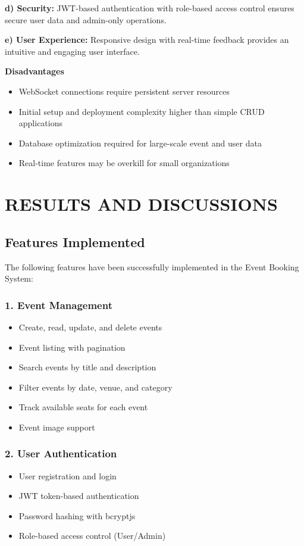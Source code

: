 \documentclass[12pt]{report}
\begin{document}
\textbf{d) Security:} 
JWT-based authentication with role-based access control ensures secure user data and admin-only operations.

\textbf{e) User Experience:} 
Responsive design with real-time feedback provides an intuitive and engaging user interface.

\textbf{Disadvantages} 

\begin{itemize}
\item WebSocket connections require persistent server resources
\item Initial setup and deployment complexity higher than simple CRUD applications
\item Database optimization required for large-scale event and user data
\item Real-time features may be overkill for small organizations
\end{itemize}

\chapter{RESULTS AND DISCUSSIONS} 
\linespread{1.5} 

\section{Features Implemented}

The following features have been successfully implemented in the Event Booking System:

\subsection{1. Event Management}
\begin{itemize}
\item Create, read, update, and delete events
\item Event listing with pagination
\item Search events by title and description
\item Filter events by date, venue, and category
\item Track available seats for each event
\item Event image support
\end{itemize}

\subsection{2. User Authentication}
\begin{itemize}
\item User registration and login
\item JWT token-based authentication
\item Password hashing with bcryptjs
\item Role-based access control (User/Admin)
\end{itemize}
\end{document}
